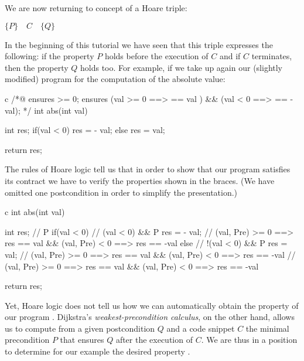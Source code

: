 \documentclass[middle]{zmdocument}
\begin{document}


We are now returning to concept of a Hoare triple:




\begin{center}
$\{ P \}\quad  C\quad \{ Q \}$


\end{center}


In the beginning of this tutorial we have seen that this triple
expresses the following: if the property $P$ holds before the
execution of $C$ and if $C$ terminates, then the property $Q$
holds too. For example, if we take up again our (slightly modified)
program for the computation of the absolute value:



\begin{CodeBlock}{c}
/*@
  ensures \result >= 0;
  ensures (val >= 0 ==> \result == val ) && (val <  0 ==> \result == -val);
*/
int abs(int val){
  int res;
  if(val < 0) res = - val;
  else        res = val;

  return res;
}
\end{CodeBlock}



The rules of Hoare logic tell us that in order to show that our program
satisfies its contract we have to verify the properties shown in the
braces. (We have omitted one postcondition in order to simplify the
presentation.)



\begin{CodeBlock}{c}
int abs(int val){
  int res;
// { P }
  if(val < 0){
// {  (val < 0) && P }
    res = - val;
// { \at(val, Pre) >= 0 ==> res == val && \at(val, Pre) < 0 ==> res == -val }
  } else {
// { !(val < 0) && P }
    res = val;
// { \at(val, Pre) >= 0 ==> res == val && \at(val, Pre) < 0 ==> res == -val }
  }
// { \at(val, Pre) >= 0 ==> res == val && \at(val, Pre) < 0 ==> res == -val }

  return res;
}
\end{CodeBlock}



Yet, Hoare logic does not tell us how we can automatically obtain the
property  of our program . Dijkstra's
\emph{weakest-precondition calculus}, on the other hand, allows us to
compute from a given postcondition $Q$ and a code snippet $C$ the
minimal precondition $P$ that ensures $Q$ after the execution of
$C$. We are thus in a position to determine for our example
 the desired property .
\end{document}
